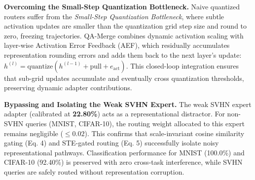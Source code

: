 \textbf{Overcoming the Small-Step Quantization Bottleneck.} Naive quantized routers suffer from the \emph{Small-Step Quantization Bottleneck}, where subtle activation updates are smaller than the quantization grid step size and round to zero, freezing trajectories. QA-Merge combines dynamic activation scaling with layer-wise Activation Error Feedback (AEF), which residually accumulates representation rounding errors and adds them back to the next layer's update: $h^{(l)} = \text{quantize}(h^{(l-1)} + \text{pull} + e_{\text{act}})$. This closed-loop integration ensures that sub-grid updates accumulate and eventually cross quantization thresholds, preserving dynamic adapter contributions.

\textbf{Bypassing and Isolating the Weak SVHN Expert.} The weak SVHN expert adapter (calibrated at \textbf{22.80\%}) acts as a representational distractor. For non-SVHN queries (MNIST, CIFAR-10), the routing weight allocated to this expert remains negligible ($\le 0.02$). This confirms that scale-invariant cosine similarity gating (Eq. 4) and STE-gated routing (Eq. 5) successfully isolate noisy representational pathways. Classification performance for MNIST (100.0\%) and CIFAR-10 (92.40\%) is preserved with zero cross-task interference, while SVHN queries are safely routed without representation corruption.

